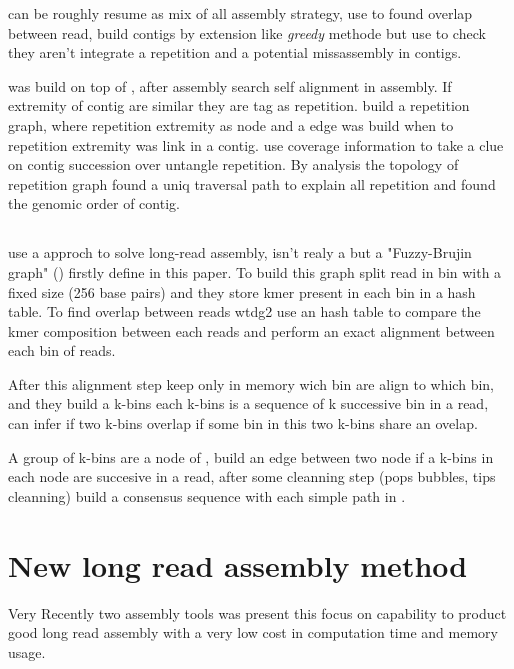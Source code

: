 \documentclass[main]{subfiles}
\begin{document}
\abruijn can be roughly resume as mix of all assembly strategy, use \DBG to found overlap between read, build contigs by extension like \textit{greedy} methode but use \OLC to check they aren't integrate a repetition and a potential missassembly in contigs.

\flye was build on top of \abruijn, after \abruijn assembly \flye search self alignment in assembly. If extremity of contig are similar they are tag as repetition. \flye build a repetition graph, where repetition extremity as node and a edge was build when to repetition extremity was link in a contig. \flye use coverage information to take a clue on contig succession over untangle repetition. By analysis the topology of repetition graph \flyecan found a uniq traversal path to explain all repetition and found the genomic order of contig.

\subsection{\wtdbg}

\wtdbg \cite{wtdbg2}  use a \DBG approch to solve long-read assembly, isn't realy a \DBG but a "Fuzzy-Brujin graph" () firstly define in this paper. To build this graph \wtdbg split read in bin with a fixed size (256 base pairs) and they store kmer present in each bin in a hash table.
To find overlap between reads wtdg2 use an hash table to compare the kmer composition between each reads and perform an exact alignment between each bin of reads. 

After this alignment step \wtdbg keep only in memory wich bin are align to which bin, and they build a k-bins each k-bins is a sequence of k successive bin in a read, \wtdbg can infer if two k-bins overlap if some bin in this two k-bins share an ovelap.

A group of k-bins are a node of , \wtdbg build an edge between two node if a k-bins in each node are succesive in a read, after some cleanning step (pops bubbles, tips cleanning) \wtdbg build a consensus sequence with each simple path in .

\section{New long read assembly method}

Very Recently two assembly tools was present this focus on capability to product good long read assembly with a very low cost in computation time and memory usage.
\end{document}
